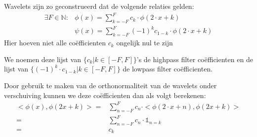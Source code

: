 \documentclass[11pt]{article}
\newcommand{\N}{\mathbb{N}}
\newcommand{\eq}[1]{\begin{eqnarray*} #1 \end{eqnarray*}}
\begin{document}
Wavelets zijn zo geconstrueerd dat de volgende relaties gelden:
\eq{
  \exists F \in \N :& \phi(x) = \sum_{k=-F}^F c_k \cdot \phi(2\cdot x + k) \\
 &\psi(x) = \sum_{k=-F}^F (-1)^k c_{1-k} \cdot \phi(2\cdot x + k)
}
Hier hoeven niet alle co\"efficienten $c_k$ ongelijk nul te zijn

We noemen deze lijst van $\{c_k | k\in[-F,F]\}$'s de highpass filter co\"efficienten en de lijst van $\{(-1)^k \cdot c_{1-k} | k\in[-F,F]\}$ de lowpass filter co\"efficienten.

Door gebruik te maken van de orthonormaliteit van de wavelets onder verschuiving kunnen
we deze co\"efficienten dan als volgt berekenen:
\eq{
  <\phi(x),\phi(2x+k)> =& \sum_{n=-F}^F c_n \cdot <\phi(2\cdot x + n),\phi(2x+k)> \\
                       =& \sum_{n=-F}^F c_n \cdot \mathbb{1}_{n=k} \\
                       =& c_k
}
\end{document}
